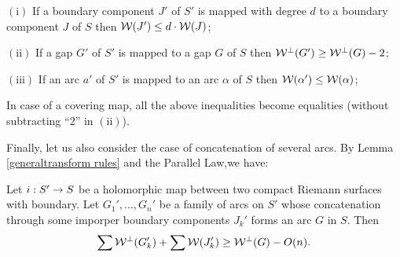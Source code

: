 {\begin{lem}
\ssk\nin $ \mathrm{(i)} $  If a boundary component $J' $ of $S'$ is mapped
with degree $d$ to a boundary component $J $ of $S$ then 
$ {\mathcal W}(J')\leq d\cdot {\mathcal W}(J)$;

\ssk\nin $ \mathrm{(ii)} $  If a  gap  %
$G ' $ of $S'$ is mapped
to a   gap  %
$G $ of $S$ then ${\mathcal W}^\perp (G')\geq {\mathcal W}^\perp (G)- 2 $;


\ssk\nin $\mathrm { (iii) } $
 If an arc $a ' $ of $S'$ is mapped
to an arc  $\alpha $ of $S$ then ${\mathcal W} (\alpha')\leq {\mathcal W} (\alpha)$;

\ssk 
In case of a covering map, all the above inequalities become
equalities (without  subtracting ``$2$'' in $\mathrm { (ii) } $). 
\end{lem}





Finally, let us also consider the case of concatenation of several
arcs. By Lemma \ref{generaltransform rules}  
and  the Parallel Law,we have: 


\begin{lem}\label{transform rule for concatenation}
Let $i: S' \rightarrow S$ be a  holomorphic map between
two compact  Riemann surfaces with boundary.
Let $G_1', \dots , G_n'$ be a family of arcs on $S'$ 
whose concatenation through some imporper boundary components $J_k'$ 
forms an arc $G$ in $S$. Then
$$
   \sum {\mathcal W}^\perp (G_k') + \sum {\mathcal W}( J_k') \geq {\mathcal W}^\perp(G) - O(n). 
$$
\end{lem} 


}
